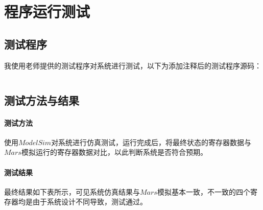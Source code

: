 \documentclass[main.tex]{subfiles}
\begin{document}
\section{程序运行测试}

\subsection{测试程序}
我使用老师提供的测试程序对系统进行测试，以下为添加注释后的测试程序源码：
\inputminted[linenos]{gas}{Project1/p1-test-commented.asm}

\clearpage

\subsection{测试方法与结果}

\paragraph{测试方法}
使用$ModelSim$对系统进行仿真测试，运行完成后，将最终状态的寄存器数据与$Mars$模拟运行的寄存器数据对比，以此判断系统是否符合预期。

\paragraph{测试结果}
最终结果如下表所示，可见系统仿真结果与$Mars$模拟基本一致，不一致的四个寄存器均是由于系统设计不同导致，测试通过。
\end{document}
